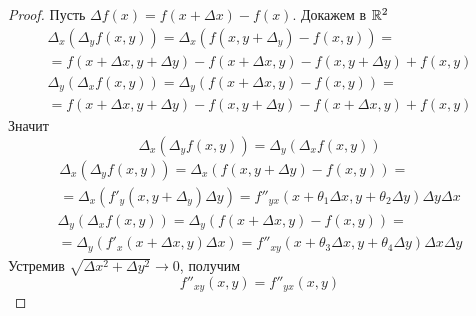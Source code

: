\begin{proof} 
    Пусть $\Delta f(x)=f(x+\Delta x)-f(x)$. Докажем в $\mathbb{R}^2$
    \begin{multline*}
        \Delta_x(\Delta_y f(x,y))=\Delta_x(f(x,y+\Delta_y)-f(x,y))=\\
        =f(x+\Delta x, y+\Delta y)-f(x+\Delta x, y)-f(x,y+\Delta y)+f(x,y)
    \end{multline*}
    \begin{multline*}
        \Delta_y(\Delta_x f(x,y))=\Delta_y(f(x+\Delta x,y)-f(x,y))=\\
        =f(x+\Delta x, y+\Delta y)-f(x,y+\Delta y)-f(x+\Delta x,y)+f(x,y)
    \end{multline*}
    Значит
    \[\Delta_x(\Delta_y f(x,y))=\Delta_y(\Delta_x f(x,y))\]
    \begin{multline*}
        \Delta_x(\Delta_y f(x,y))=\Delta_x (f(x,y+\Delta y)-f(x,y))=\\
        =\Delta_x(f'_y(x,y+\Delta_y)\Delta y)=f''_{yx}(x+\theta_1\Delta x,y+\theta_2\Delta y)\Delta y \Delta x
    \end{multline*}
    \begin{multline*}
        \Delta_y(\Delta_x f(x,y))=\Delta_y (f(x+\Delta x,y)-f(x,y))=\\
        =\Delta_y(f'_x(x+\Delta x,y)\Delta x)=f''_{xy}(x+\theta_3 \Delta x, y+\theta_4 \Delta y)\Delta x\Delta y
    \end{multline*}
    Устремив $\sqrt{\Delta x^2+\Delta y^2}\to 0$, получим
    \[f''_{xy}(x,y)=f''_{yx}(x,y)\]
\end{proof} 